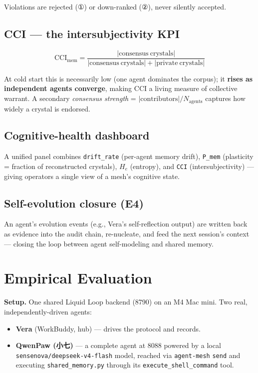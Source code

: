 \documentclass[UTF8]{ctexart}
\begin{document}
\vspace{0.4em}
Violations are rejected (①) or down-ranked (②), never silently accepted.

\subsection{CCI --- the intersubjectivity KPI}
\begin{equation}
\mathrm{CCI}_{\mathrm{mem}} = \frac{|\mathrm{consensus\ crystals}|}{|\mathrm{consensus\ crystals}| + |\mathrm{private\ crystals}|}
\end{equation}

At cold start this is necessarily low (one agent dominates the corpus); it
\textbf{rises as independent agents converge}, making CCI a living measure of
collective warrant. A secondary \emph{consensus strength} = $|\mathrm{contributors}| / N_{\mathrm{agents}}$
captures how widely a crystal is endorsed.

\subsection{Cognitive-health dashboard}
A unified panel combines \texttt{drift\_rate} (per-agent memory drift), \texttt{P\_mem}
(plasticity = fraction of reconstructed crystals), $H_e$ (entropy), and \texttt{CCI}
(intersubjectivity) --- giving operators a single view of a mesh's cognitive state.

\subsection{Self-evolution closure (E4)}
An agent's evolution events (e.g., Vera's self-reflection output) are written
back as evidence into the audit chain, re-nucleate, and feed the next session's
context --- closing the loop between agent self-modeling and shared memory.

\section{Empirical Evaluation}
\textbf{Setup.} One shared Liquid Loop backend (8790) on an M4 Mac mini. Two real,
independently-driven agents:
\begin{itemize}
  \item \textbf{Vera} (WorkBuddy, hub) --- drives the protocol and records.
  \item \textbf{QwenPaw (小七)} --- a complete agent at 8088 powered by a local
  \texttt{sensenova/deepseek-v4-flash} model, reached via \texttt{agent-mesh} \texttt{send} and
  executing \texttt{shared\_memory.py} through its \texttt{execute\_shell\_command} tool.
\end{itemize}
\end{document}
